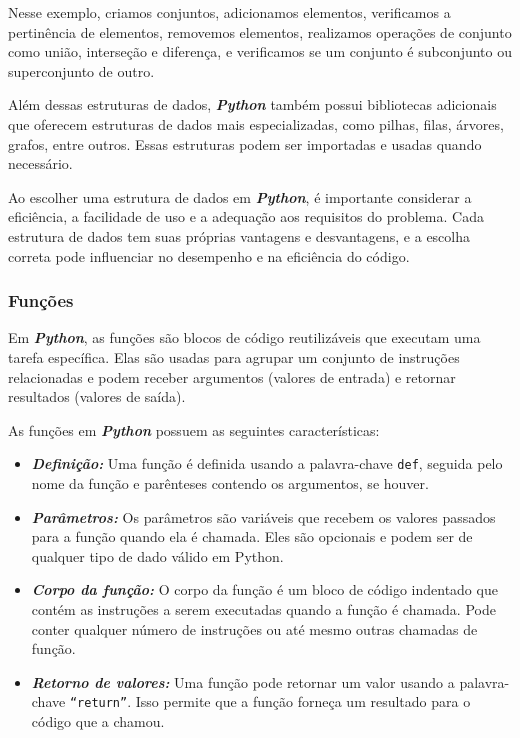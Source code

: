 \documentclass[a4paper, 12pt, onecolumn,singlespacing]{article}
\begin{document}
	Nesse exemplo, criamos conjuntos, adicionamos elementos, verificamos a pertinência de elementos, removemos elementos, realizamos operações de conjunto como união, interseção e diferença, e verificamos se um conjunto é subconjunto ou superconjunto de outro.

	Além dessas estruturas de dados, \textit{\textbf{Python}} também possui bibliotecas adicionais que oferecem estruturas de dados mais especializadas, como pilhas, filas, árvores, grafos, entre outros. Essas estruturas podem ser importadas e usadas quando necessário.
	
	Ao escolher uma estrutura de dados em \textit{\textbf{Python}}, é importante considerar a eficiência, a facilidade de uso e a adequação aos requisitos do problema. Cada estrutura de dados tem suas próprias vantagens e desvantagens, e a escolha correta pode influenciar no desempenho e na eficiência do código.
	
	\subsubsection{Funções}
	\label{python_funcoes}
	
	Em \textbf{\textit{Python}}, as funções são blocos de código reutilizáveis que executam uma tarefa específica. Elas são usadas para agrupar um conjunto de instruções relacionadas e podem receber argumentos (valores de entrada) e retornar resultados (valores de saída).
	
	As funções em \textbf{\textit{Python}} possuem as seguintes características:
	
	\begin{itemize}
	
	\item \textbf{\textit{Definição:}} Uma função é definida usando a palavra-chave \texttt{def}, seguida pelo nome da função e parênteses contendo os argumentos, se houver.
	
	\item \textbf{\textit{Parâmetros:}} Os parâmetros são variáveis que recebem os valores passados para a função quando ela é chamada. Eles são opcionais e podem ser de qualquer tipo de dado válido em Python.
	
	\item \textbf{\textit{Corpo da função:}} O corpo da função é um bloco de código indentado que contém as instruções a serem executadas quando a função é chamada. Pode conter qualquer número de instruções ou até mesmo outras chamadas de função.
	
	\item \textbf{\textit{Retorno de valores:}} Uma função pode retornar um valor usando a palavra-chave \texttt{``return''}. Isso permite que a função forneça um resultado para o código que a chamou.
	
	\end{itemize}
	
\end{document}
